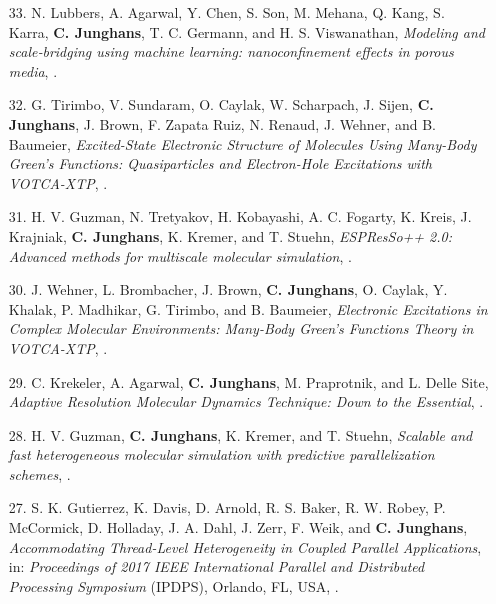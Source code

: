 \documentclass{article}
\begin{document}
\begin{enumerate}
\item[33.] N. Lubbers, A. Agarwal, Y. Chen, S. Son, M. Mehana, Q. Kang, S. Karra, \textbf{C. Junghans}, T. C. Germann, and  H. S. Viswanathan,
  \textit{Modeling and scale‐bridging using machine learning: nanoconfinement effects in porous media},
  .

\item[32.] G. Tirimbo, V. Sundaram, O. Caylak, W. Scharpach, J. Sijen, \textbf{C. Junghans}, J. Brown, F. Zapata Ruiz, N. Renaud, J. Wehner, and B. Baumeier,
  \textit{Excited-State Electronic Structure of Molecules Using Many-Body Green’s Functions: Quasiparticles and Electron-Hole Excitations with VOTCA-XTP},
  .

\item[31.] H. V. Guzman, N. Tretyakov, H. Kobayashi, A. C. Fogarty, K. Kreis, J. Krajniak, \textbf{C. Junghans}, K. Kremer, and T. Stuehn,
  \textit{ESPResSo++ 2.0: Advanced methods for multiscale molecular simulation},
  .

\item[30.] J. Wehner, L. Brombacher, J. Brown, \textbf{C. Junghans}, O. Caylak, Y. Khalak, P. Madhikar, G. Tirimbo, and B. Baumeier,
  \textit{Electronic Excitations in Complex Molecular Environments: Many-Body Green's Functions Theory in VOTCA-XTP},
  .

\item[29.] C. Krekeler, A. Agarwal, \textbf{C. Junghans}, M. Praprotnik, and L. Delle Site,
  \textit{Adaptive Resolution Molecular Dynamics Technique: Down to the Essential},
  .

\item[28.] H. V. Guzman, \textbf{C. Junghans}, K. Kremer, and T. Stuehn,
  \textit{Scalable and fast heterogeneous molecular simulation with predictive parallelization schemes},
  .

\item[27.] S. K. Gutierrez, K. Davis, D. Arnold, R. S. Baker, R. W. Robey, P. McCormick, D. Holladay, J. A. Dahl, J. Zerr, F. Weik, and \textbf{C. Junghans},
  \textit{Accommodating Thread-Level Heterogeneity in Coupled Parallel Applications},
  in: \textit{Proceedings of 2017 IEEE International Parallel and Distributed Processing Symposium} (IPDPS),
  Orlando, FL, USA, .


\end{enumerate}
\end{document}
